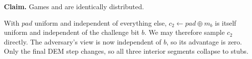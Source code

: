 \textbf{Claim.}
  Games  and  are identically
  distributed.

With $\mathit{pad}$ uniform and independent of everything else, $c_2 \gets
\mathit{pad} \oplus m_b$ is itself uniform and independent of the challenge bit
$b$. We may therefore sample $c_2$ directly. The adversary's view is now
independent of $b$, so its advantage is zero. Only the final DEM step changes,
so all three interior segments collapse to stubs.
